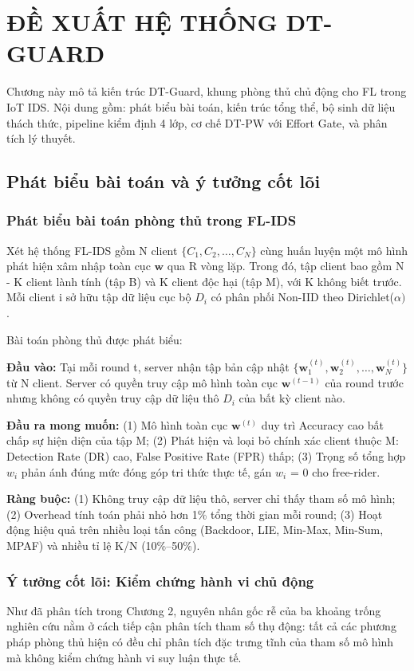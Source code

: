 \chapter{ĐỀ XUẤT HỆ THỐNG DT-GUARD}
\label{Chapter4}

Chương này mô tả kiến trúc DT-Guard, khung phòng thủ chủ động cho FL trong IoT IDS. Nội dung gồm: phát biểu bài toán, kiến trúc tổng thể, bộ sinh dữ liệu thách thức, pipeline kiểm định 4 lớp, cơ chế DT-PW với Effort Gate, và phân tích lý thuyết.

\section{Phát biểu bài toán và ý tưởng cốt lõi}

\subsection{Phát biểu bài toán phòng thủ trong FL-IDS}
Xét hệ thống FL-IDS gồm N client $\{C_{1}, C_{2}, \ldots, C_{N}\}$ cùng huấn luyện một mô hình phát hiện xâm nhập toàn cục $\mathbf{w}$ qua R vòng lặp. Trong đó, tập client bao gồm N - K client lành tính (tập B) và K client độc hại (tập M), với K không biết trước. Mỗi client i sở hữu tập dữ liệu cục bộ $D_{i}$ có phân phối Non-IID theo Dirichlet($\alpha)$.

Bài toán phòng thủ được phát biểu:

\textbf{Đầu vào:} Tại mỗi round t, server nhận tập bản cập nhật $\{\mathbf{w}_{1}^{(t)}, \mathbf{w}_{2}^{(t)}, \ldots, \mathbf{w}_{N}^{(t)}\}$ từ N client. Server có quyền truy cập mô hình toàn cục $\mathbf{w}^{(t-1)}$ của round trước nhưng không có quyền truy cập dữ liệu thô $D_{i}$ của bất kỳ client nào.

\textbf{Đầu ra mong muốn:} (1) Mô hình toàn cục $\mathbf{w}^{(t)}$ duy trì Accuracy cao bất chấp sự hiện diện của tập M; (2) Phát hiện và loại bỏ chính xác client thuộc M: Detection Rate (DR) cao, False Positive Rate (FPR) thấp; (3) Trọng số tổng hợp $w_{i}$ phản ánh đúng mức đóng góp tri thức thực tế, gán $w_{i}$ = 0 cho free-rider.

\textbf{Ràng buộc:} (1) Không truy cập dữ liệu thô, server chỉ thấy tham số mô hình; (2) Overhead tính toán phải nhỏ hơn 1\% tổng thời gian mỗi round; (3) Hoạt động hiệu quả trên nhiều loại tấn công (Backdoor, LIE, Min-Max, Min-Sum, MPAF) và nhiều tỉ lệ K/N (10\%--50\%).

\subsection{Ý tưởng cốt lõi: Kiểm chứng hành vi chủ động}
Như đã phân tích trong Chương 2, nguyên nhân gốc rễ của ba khoảng trống nghiên cứu nằm ở cách tiếp cận phân tích tham số thụ động: tất cả các phương pháp phòng thủ hiện có đều chỉ phân tích đặc trưng tĩnh của tham số mô hình mà không kiểm chứng hành vi suy luận thực tế.

